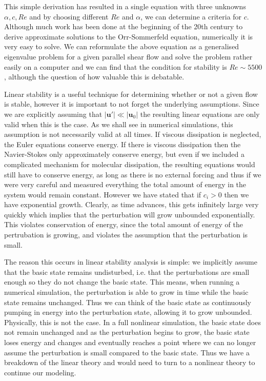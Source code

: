 This simple derivation has resulted in a single equation with three unknowns $\alpha,c,Re$ and by choosing different $Re$ and $\alpha$, we can determine a criteria for $c$. Although much work has been done at the beginning of the 20th century to derive approximate solutions to the Orr-Sommerfeld equation, numerically it is very easy to solve. We can reformulate the above equation as a generalised eigenvalue problem for a given parallel shear flow and solve the problem rather easily on a computer\cite{trefethen_spectral} and we can find that the condition for stability is $Re\sim 5500$, although the question of how valuable this is debatable\cite{trefethen_spectral}.

Linear stability is a useful technique for determining whether or not a given flow is stable, however it is important to not forget the underlying assumptions. Since we are explicitly assuming that $|\bm{u}'|\ll |\bm{u}_{0}|$ the resulting linear equations are only valid when this is the case. As we shall see in numerical simulations, this assumption is not necessarily valid at all times. If viscous dissipation is neglected, the Euler equations conserve energy. If there is viscous dissipation then the Navier-Stokes only approximately conserve energy, but even if we included a complicated mechanism for molecular dissipation, the resulting equations would still have to conserve energy, as long as there is no external forcing and thus if we were very careful and measured everything the total amount of energy in the system would remain constant. However we have stated that if $c_{i}>0$ then we have exponential growth. Clearly, as time advances, this gets infinitely large very quickly which implies that the perturbation will grow unbounded exponentially. This violates conservation of energy, since the total amount of energy of the pertrubation is growing, and violates the assumption that the perturbation is small.  

The reason this occurs in linear stability analysis is simple: we implicitly assume that the basic state remains undisturbed, i.e. that the perturbations are small enough so they do not change the basic state. This means, when running a numerical simulation, the perturbation is able to grow in time while the basic state remains unchanged. Thus we can think of the basic state as continuously pumping in energy into the perturbation state, allowing it to grow unbounded. Physically, this is not the case. In a full nonlinear simulation, the basic state does not remain unchanged and as the perturbation begins to grow, the basic state loses energy and changes and eventually reaches a point where we can no longer assume the perturbation is small compared to the basic state. Thus we have a breakdown of the linear theory and would need to turn to a nonlinear theory to continue our modeling. 

